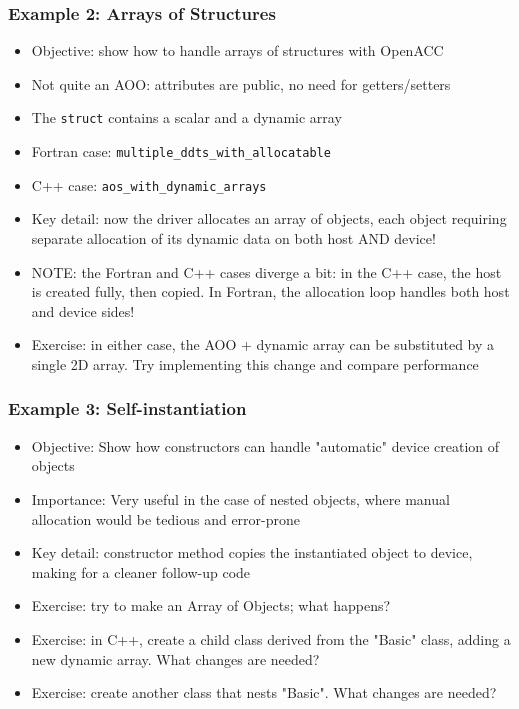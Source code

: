 \begin{frame}
    \frametitle{Example 2: Arrays of Structures}
    \begin{itemize}
        \item Objective: show how to handle arrays of structures with OpenACC
        \item Not quite an AOO: attributes are public, no need for getters/setters
        \item The \texttt{struct} contains a scalar and a dynamic array
        \item Fortran case: \texttt{multiple\_ddts\_with\_allocatable}
        \item C++ case: \texttt{aos\_with\_dynamic\_arrays}
        \item Key detail: now the driver allocates an array of objects, each object requiring separate allocation of its dynamic data on both host AND device!
        \item NOTE: the Fortran and C++ cases diverge a bit: in the C++ case, the host is created fully, then copied. In Fortran, the allocation loop handles both host and device sides!
        \item Exercise: in either case, the AOO + dynamic array can be substituted by a single 2D array. Try implementing this change and compare performance
    \end{itemize}
\end{frame}

\begin{frame}
    \frametitle{Example 3: Self-instantiation}
    \begin{itemize}
        \item Objective: Show how constructors can handle "automatic" device creation of objects
        \item Importance: Very useful in the case of nested objects, where manual allocation would be tedious and error-prone
        \item Key detail: constructor method copies the instantiated object to device, making for a cleaner follow-up code
        \item Exercise: try to make an Array of Objects; what happens?
        \item Exercise: in C++, create a child class derived from the "Basic" class, adding a new dynamic array. What changes are needed?
        \item Exercise: create another class that nests "Basic". What changes are needed?
    \end{itemize}
\end{frame}

